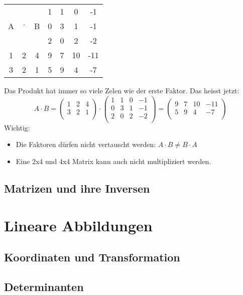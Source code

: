 \begin{tabular}{|ccc||cccc|}
\hline
        &   &   & 1 & 1 & 0 & -1 \\
  A & $\cdot$  & B & 0 & 3 & 1 & -1 \\
        &   &   & 2 & 0 & 2 & -2 \\
      \hline
      \hline
      1 & 2 & 4 & 9 & 7 & 10 & -11 \\
      3 & 2 & 1 & 5 & 9 & 4 & -7 \\
  \hline
\end{tabular}

Das Produkt hat immer so viele Zelen wie der erste Faktor.
Das heisst jetzt:
\[ A \cdot B = 
  \begin {pmatrix}
    1 & 2 & 4 \\
    3 & 2 & 1 \\
  \end {pmatrix} \cdot 
  \begin {pmatrix}
    1 & 1 & 0 & -1 \\
    0 & 3 & 1 & -1 \\
    2 & 0 & 2 & -2 \\
  \end {pmatrix} =
  \begin {pmatrix}
    9 & 7 & 10 & -11 \\
    5 & 9 & 4 & -7 \\
\end {pmatrix} \]
Wichtig:
\begin{itemize}
  \item Die Faktoren dürfen nicht vertauscht werden:  $ A \cdot B \ne B \cdot A $
  \item Eine 2x4 und 4x4 Matrix kann auch nicht multipliziert werden.
\end{itemize}

\subsection{Matrizen und ihre Inversen}

\section{Lineare Abbildungen}
\subsection{Koordinaten und Transformation}
\subsection{Determinanten}
